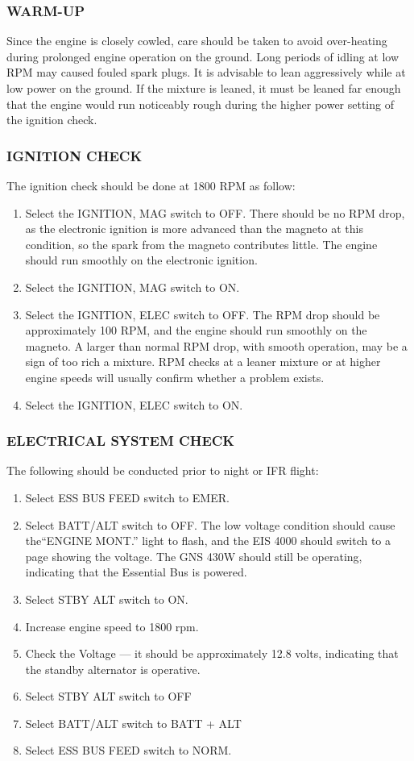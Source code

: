   \subsubsection{WARM-UP}
  Since the engine is closely cowled, care should be taken to avoid over-heating during prolonged engine operation on the ground. Long periods of idling at low RPM may caused fouled spark plugs. It is advisable to lean aggressively while at low power on the ground. If the mixture is leaned, it must be leaned far enough that the engine would run noticeably rough during the higher power setting of the ignition check.
  
  \subsubsection{IGNITION CHECK}
  The ignition check should be done at 1800 RPM as follow:
  \begin{enumerate}
  \item Select the IGNITION, MAG switch to OFF. There should be no RPM drop, as the electronic ignition is more advanced than the magneto at this condition, so the spark from the magneto contributes little. The engine should run smoothly on the electronic ignition.
  \item Select the IGNITION, MAG switch to ON.
  \item Select the IGNITION, ELEC switch to OFF. The RPM drop should be approximately 100 RPM, and the engine should run smoothly on the magneto. A larger than normal RPM drop, with smooth operation, may be a sign of too rich a mixture. RPM checks at a leaner mixture or at higher engine speeds will usually confirm whether a problem exists.
  \item Select the IGNITION, ELEC switch to ON.
  \end{enumerate}
  
  \subsubsection{ELECTRICAL SYSTEM CHECK}
  The following should be conducted prior to night or IFR flight:
  \begin{enumerate}
    \item Select ESS BUS FEED switch to EMER.
    \item Select BATT/ALT switch to OFF. The low voltage condition should cause the``ENGINE MONT.'' light to flash, and the EIS 4000 should switch to a page showing the voltage. The GNS 430W should still be operating, indicating that the Essential Bus is powered.
    \item Select STBY ALT switch to ON. 
    \item Increase engine speed to 1800 rpm.
    \item Check the Voltage --- it should be approximately 12.8 volts, indicating that the standby alternator is operative.
    \item Select STBY ALT switch to OFF
    \item Select BATT/ALT switch to BATT + ALT
    \item Select ESS BUS FEED switch to NORM.
    \end{enumerate}
  
